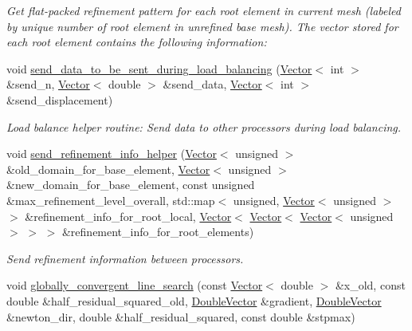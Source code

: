 \begin{DoxyCompactItemize}
\begin{DoxyCompactList}\small\item\em Get flat-\/packed refinement pattern for each root element in current mesh (labeled by unique number of root element in unrefined base mesh). The vector stored for each root element contains the following information\+: \end{DoxyCompactList}\item 
void \hyperlink{classoomph_1_1Problem_a3e07d0acd3499ac7736fba1841ad1cf2}{send\+\_\+data\+\_\+to\+\_\+be\+\_\+sent\+\_\+during\+\_\+load\+\_\+balancing} (\hyperlink{classoomph_1_1Vector}{Vector}$<$ int $>$ \&send\+\_\+n, \hyperlink{classoomph_1_1Vector}{Vector}$<$ double $>$ \&send\+\_\+data, \hyperlink{classoomph_1_1Vector}{Vector}$<$ int $>$ \&send\+\_\+displacement)
\begin{DoxyCompactList}\small\item\em Load balance helper routine\+: Send data to other processors during load balancing. \end{DoxyCompactList}\item 
void \hyperlink{classoomph_1_1Problem_a90e714411f1575e0e39cf0d497287b37}{send\+\_\+refinement\+\_\+info\+\_\+helper} (\hyperlink{classoomph_1_1Vector}{Vector}$<$ unsigned $>$ \&old\+\_\+domain\+\_\+for\+\_\+base\+\_\+element, \hyperlink{classoomph_1_1Vector}{Vector}$<$ unsigned $>$ \&new\+\_\+domain\+\_\+for\+\_\+base\+\_\+element, const unsigned \&max\+\_\+refinement\+\_\+level\+\_\+overall, std\+::map$<$ unsigned, \hyperlink{classoomph_1_1Vector}{Vector}$<$ unsigned $>$ $>$ \&refinement\+\_\+info\+\_\+for\+\_\+root\+\_\+local, \hyperlink{classoomph_1_1Vector}{Vector}$<$ \hyperlink{classoomph_1_1Vector}{Vector}$<$ \hyperlink{classoomph_1_1Vector}{Vector}$<$ unsigned $>$ $>$ $>$ \&refinement\+\_\+info\+\_\+for\+\_\+root\+\_\+elements)
\begin{DoxyCompactList}\small\item\em Send refinement information between processors. \end{DoxyCompactList}\item 
void \hyperlink{classoomph_1_1Problem_ac60d7455a13ee171060c3a81623840b2}{globally\+\_\+convergent\+\_\+line\+\_\+search} (const \hyperlink{classoomph_1_1Vector}{Vector}$<$ double $>$ \&x\+\_\+old, const double \&half\+\_\+residual\+\_\+squared\+\_\+old, \hyperlink{classoomph_1_1DoubleVector}{Double\+Vector} \&gradient, \hyperlink{classoomph_1_1DoubleVector}{Double\+Vector} \&newton\+\_\+dir, double \&half\+\_\+residual\+\_\+squared, const double \&stpmax)

\end{DoxyCompactItemize}
